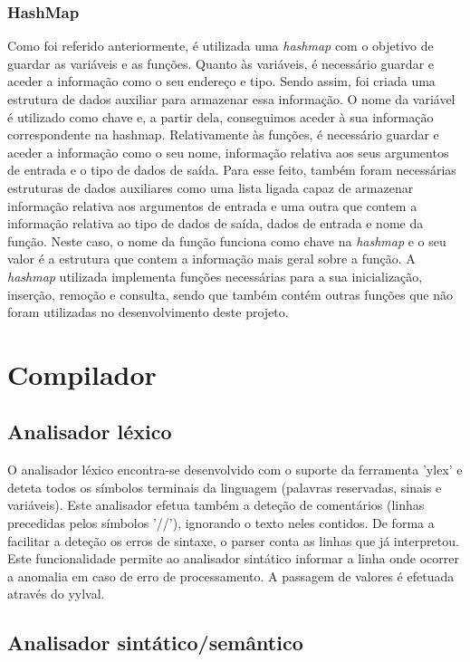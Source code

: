 \documentclass[a4paper,10pt]{report}
\begin{document}
\subsection{HashMap}
	Como foi referido anteriormente, é utilizada uma \emph{hashmap} com o objetivo de guardar as variáveis e as funções. Quanto às variáveis, é necessário guardar e aceder a informação como o seu endereço e tipo. Sendo assim, foi criada uma estrutura de dados auxiliar para armazenar essa informação. O nome da variável é utilizado como chave e, a partir dela, conseguimos aceder à sua informação correspondente na hashmap. 
	Relativamente às funções, é necessário guardar e aceder a informação como o seu nome, informação relativa aos seus argumentos de entrada e o tipo de dados de saída. Para esse feito, também foram necessárias estruturas de dados auxiliares como uma lista ligada capaz de armazenar informação relativa aos argumentos de entrada e uma outra que contem a informação relativa ao tipo de dados de saída, dados de entrada e nome da função. Neste caso, o nome da função funciona como chave na \emph{hashmap} e o seu valor é a estrutura que contem a informação mais geral sobre a função.
	A \emph{hashmap} utilizada implementa funções necessárias para a sua inicialização, inserção, remoção e consulta, sendo que também contém outras funções que não foram utilizadas no desenvolvimento deste projeto.


\chapter{Compilador}


\section{Analisador léxico}
  O analisador léxico encontra-se desenvolvido com o suporte da ferramenta 'ylex' e deteta todos os símbolos terminais da linguagem (palavras reservadas, sinais e variáveis). Este analisador efetua também a deteção de comentários (linhas precedidas pelos símbolos '//'), ignorando o texto neles contidos. De forma a facilitar a deteção os erros de sintaxe, o parser conta as linhas que já interpretou. Este funcionalidade permite ao analisador sintático informar a linha onde ocorrer a anomalia em caso de erro de processamento. A passagem de valores é efetuada através do yylval.  

\section{Analisador sintático/semântico}
\end{document}
